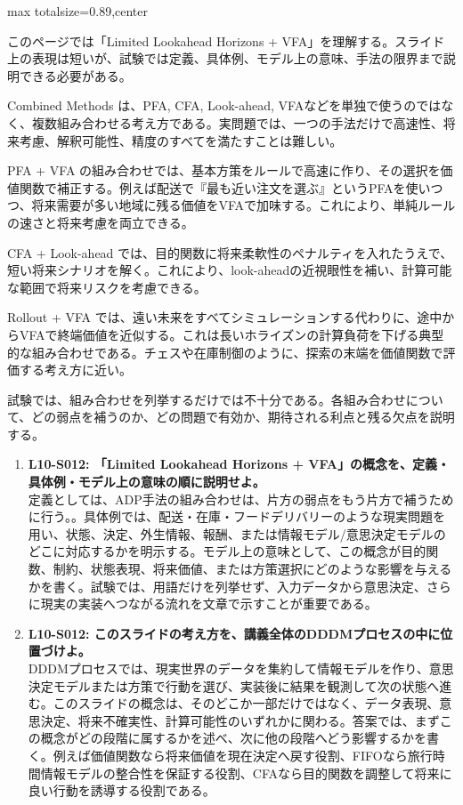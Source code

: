 \begin{minipage}[t]{0.58\textwidth}
\begin{adjustbox}{max totalsize={\textwidth}{0.89\textheight},center}
\begin{minipage}{\textwidth}\scriptsize
{}このページでは「Limited Lookahead Horizons + VFA」を理解する。スライド上の表現は短いが、試験では定義、具体例、モデル上の意味、手法の限界まで説明できる必要がある。\par
Combined Methods は、PFA, CFA, Look-ahead, VFAなどを単独で使うのではなく、複数組み合わせる考え方である。実問題では、一つの手法だけで高速性、将来考慮、解釈可能性、精度のすべてを満たすことは難しい。\par
PFA + VFA の組み合わせでは、基本方策をルールで高速に作り、その選択を価値関数で補正する。例えば配送で『最も近い注文を選ぶ』というPFAを使いつつ、将来需要が多い地域に残る価値をVFAで加味する。これにより、単純ルールの速さと将来考慮を両立できる。\par
CFA + Look-ahead では、目的関数に将来柔軟性のペナルティを入れたうえで、短い将来シナリオを解く。これにより、look-aheadの近視眼性を補い、計算可能な範囲で将来リスクを考慮できる。\par
Rollout + VFA では、遠い未来をすべてシミュレーションする代わりに、途中からVFAで終端価値を近似する。これは長いホライズンの計算負荷を下げる典型的な組み合わせである。チェスや在庫制御のように、探索の末端を価値関数で評価する考え方に近い。\par
試験では、組み合わせを列挙するだけでは不十分である。各組み合わせについて、どの弱点を補うのか、どの問題で有効か、期待される利点と残る欠点を説明する。\par{}\begin{enumerate}\item \textbf{L10-S012: 「Limited Lookahead Horizons + VFA」の概念を、定義・具体例・モデル上の意味の順に説明せよ。}\\定義としては、ADP手法の組み合わせは、片方の弱点をもう片方で補うために行う。。具体例では、配送・在庫・フードデリバリーのような現実問題を用い、状態、決定、外生情報、報酬、または情報モデル/意思決定モデルのどこに対応するかを明示する。モデル上の意味として、この概念が目的関数、制約、状態表現、将来価値、または方策選択にどのような影響を与えるかを書く。試験では、用語だけを列挙せず、入力データから意思決定、さらに現実の実装へつながる流れを文章で示すことが重要である。\item \textbf{L10-S012: このスライドの考え方を、講義全体のDDDMプロセスの中に位置づけよ。}\\DDDMプロセスでは、現実世界のデータを集約して情報モデルを作り、意思決定モデルまたは方策で行動を選び、実装後に結果を観測して次の状態へ進む。このスライドの概念は、そのどこか一部だけではなく、データ表現、意思決定、将来不確実性、計算可能性のいずれかに関わる。答案では、まずこの概念がどの段階に属するかを述べ、次に他の段階へどう影響するかを書く。例えば価値関数なら将来価値を現在決定へ戻す役割、FIFOなら旅行時間情報モデルの整合性を保証する役割、CFAなら目的関数を調整して将来に良い行動を誘導する役割である。\end{enumerate}
\end{minipage}
\end{adjustbox}
\end{minipage}


